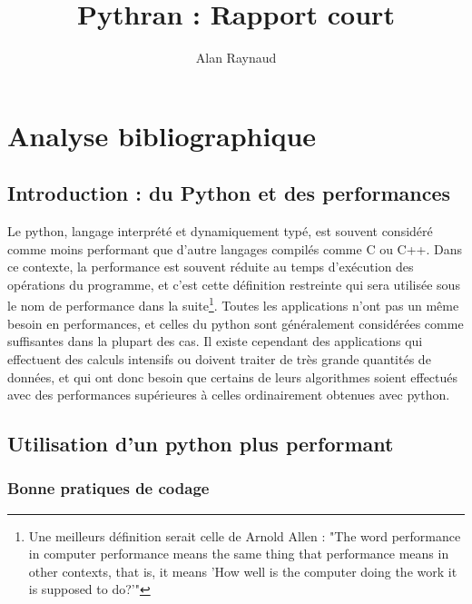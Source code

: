 \documentclass[a4paper]{article}
\title{Pythran : Rapport court}
\author{Alan Raynaud}
\date{}
\begin{document}

\maketitle   

\clearpage               

\tableofcontents            

\clearpage

\section{Analyse bibliographique}             

\subsection{Introduction : du Python et des performances}

Le python, langage interprété et dynamiquement typé, est souvent
considéré comme moins performant que d'autre langages compilés comme C
ou C++. Dans ce contexte, la performance est souvent réduite au temps
d'exécution des opérations du programme, et c'est cette définition
restreinte qui sera utilisée sous le nom de performance dans la
suite\footnote{Une meilleurs définition serait celle de Arnold Allen :
  "The word performance in computer performance means the same thing
  that performance means in other contexts, that is, it means 'How
  well is the computer doing the work it is supposed to
  do?'"\cite{Allen}}. Toutes les applications n'ont pas un même besoin
en performances, et celles du python sont généralement considérées
comme suffisantes dans la plupart des cas. Il existe cependant des
applications qui effectuent des calculs intensifs ou doivent traiter
de très grande quantités de données, et qui ont donc besoin que
certains de leurs algorithmes soient effectués avec des performances
supérieures à celles ordinairement obtenues avec python.

\subsection{Utilisation d'un python plus performant}

\label{OptCode}

\subsubsection{Bonne pratiques de codage}
\end{document}
